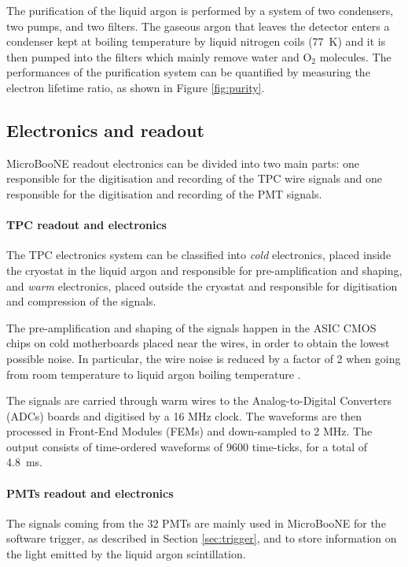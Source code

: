 The purification of the liquid argon is performed by a system of two condensers, two pumps, and two filters. The gaseous argon that leaves the detector enters a condenser kept at boiling temperature by liquid nitrogen coils (77~K) and it is then pumped into the filters which mainly remove water and O$_2$ molecules. The performances of the purification system can be quantified by measuring the electron lifetime ratio, as shown in Figure \ref{fig:purity}.

\subsection{Electronics and readout}
MicroBooNE readout electronics can be divided into two main parts: one responsible for the digitisation and recording of the TPC wire signals and one responsible for the digitisation and recording of the PMT signals. 

\paragraph{TPC readout and electronics}
The TPC electronics system can be classified into \emph{cold} electronics, placed inside the cryostat in the liquid argon and responsible for pre-amplification and shaping, and \emph{warm} electronics, placed outside the cryostat and responsible for digitisation and compression of the signals.

The pre-amplification and shaping of the signals happen in the ASIC CMOS chips on cold motherboards placed near the wires, in order to obtain the lowest possible noise. In particular, the wire noise is reduced by a factor of 2 when going from room temperature to liquid argon boiling temperature \cite{Chen:2012kv}. 

The signals are carried through warm wires to the Analog-to-Digital Converters (ADCs) boards and digitised by a 16 MHz clock. The waveforms are then processed in Front-End Modules (FEMs) and down-sampled to 2 MHz. The output consists of time-ordered waveforms of 9600 time-ticks, for a total of 4.8~ms.%

\paragraph{PMTs readout and electronics}
The signals coming from the 32 PMTs are mainly used in MicroBooNE for the software trigger, as described in Section \ref{sec:trigger}, and to store information on the light emitted by the liquid argon scintillation.

